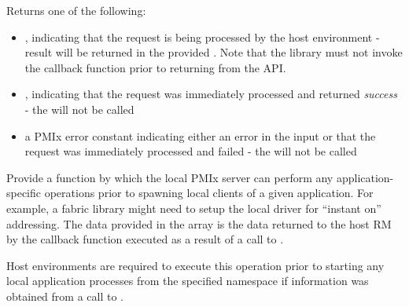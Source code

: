 \begin{arglist}
\end{arglist}

Returns one of the following:

\begin{itemize}
    \item {}, indicating that the request is being processed by the host environment - result will be returned in the provided . Note that the library must not invoke the callback function prior to returning from the \ac{API}.
    \item {}, indicating that the request was immediately processed and returned \textit{success} - the  will not be called
    \item a PMIx error constant indicating either an error in the input or that the request was immediately processed and failed - the  will not be called
\end{itemize}


\descr

Provide a function by which the local \ac{PMIx} server can perform any application-specific operations prior to spawning local clients of a given application. For example, a fabric library might need to setup the local driver for ``instant on'' addressing. The data provided in the  array is the data returned to the host \ac{RM} by the callback function executed as a result of a call to .

\advicermstart
Host environments are required to execute this operation prior to starting any local application processes from the specified namespace if information was obtained from a call to .
\advicermend

\subsection{}

\summary

